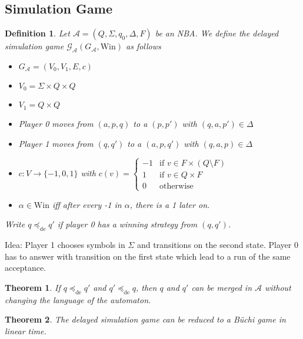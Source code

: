 \documentclass{article}
\newtheorem{theorem}{Theorem}[section]
\newtheorem{definition}{Definition}
\begin{document}
\subsection{Simulation Game}
\begin{definition}
	Let $\mathcal{A} = (Q, \Sigma, q_0, \Delta, F)$ be an NBA. We define the delayed simulation game $\mathcal{G}_\mathcal{A}(G_\mathcal{A}, \text{Win})$ as follows
	\begin{itemize}
		\item $G_\mathcal{A} = (V_0, V_1, E, c)$ 
		\item $V_0 = \Sigma \times Q \times Q$
		\item $V_1 = Q \times Q$
		\item Player 0 moves from $(a, p, q)$ to a $(p, p')$ with $(q, a, p') \in \Delta$
		\item Player 1 moves from $(q, q')$ to a $(a, p, q')$ with $(q, a, p) \in \Delta$
		\item $c : V \rightarrow \{-1, 0, 1\}$ with $c(v) = \begin{cases} -1 & \text{if } v \in F \times (Q \setminus F) \\ 1 & \text{if } v \in Q \times F \\ 0 & \text{otherwise} \end{cases}$
		\item $\alpha \in \text{Win}$ iff after every -1 in $\alpha$, there is a 1 later on.
	\end{itemize}
	
	Write $q \preceq_\text{de} q'$ if player 0 has a winning strategy from $(q, q')$.
\end{definition}

Idea: Player 1 chooses symbols in $\Sigma$ and transitions on the second state. Player 0 has to answer with transition on the first state which lead to a run of the same acceptance.

\vspace{.5cm}
\begin{theorem}
	If $q \preceq_\text{de} q'$ and $q' \preceq_\text{de} q$, then $q$ and $q'$ can be merged in $\mathcal{A}$ without changing the language of the automaton.
\end{theorem}

\vspace{.5cm}
\begin{theorem}
	The delayed simulation game can be reduced to a Büchi game in linear time.
\end{theorem}
 
\end{document}
